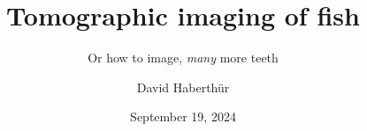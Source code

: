 \documentclass[aspectratio=169,10pt]{beamer}
\title{Tomographic imaging of fish}
\subtitle{Or how to image, \emph{many} more teeth}
\author{David Haberthür}
\institute{Institute of Anatomy}
\date{September 19, 2024}
\newcommand{\uct}{{\textmu}CT\xspace}%
\begin{document}
\begin{frame}
	\maketitle
\end{frame}


\end{document}
